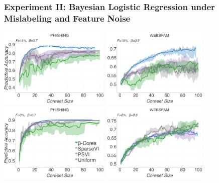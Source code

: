 \documentclass[hyperref={colorlinks = true},unknownkeysallowed]{beamer}
\begin{document}
\begin{frame}
	\frametitle{Experiment II: Bayesian Logistic Regression under Mislabeling and Feature Noise}
	\centering
	\includegraphics[width=.49\textwidth, height=3.8cm]{figs/phish09_10_15_False_False_ACCvssz.png}
	\includegraphics[width=.49\textwidth, height=3.8cm]{figs/webspam09_10_15_True_False_ACCvssz.png}
	\includegraphics[width=.49\textwidth, height=3.8cm]{figs/phish07_10_0_False_False_ACCvssz.png}
	\includegraphics[width=.49\textwidth, height=3.8cm]{figs/webspam09_10_0_True_False_ACCvssz.png}
\end{frame}
\end{document}
